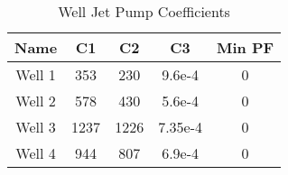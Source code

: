 \begin{table}[h]
\centering
\begin{tabular}{|c|c|c|c|c|}
\hline
Name & C1 & C2 & C3 & Min PF \\
\hline
Well 1 & 353 & 230 & 9.6e-4 & 0 \\
Well 2 & 578 & 430 & 5.6e-4 & 0 \\
Well 3 & 1237 & 1226 & 7.35e-4 & 0 \\
Well 4 & 944 & 807 & 6.9e-4 & 0 \\
\hline
\end{tabular}
\caption{Well Jet Pump Coefficients}
\label{tab:well_jp_coeff}
\end{table}